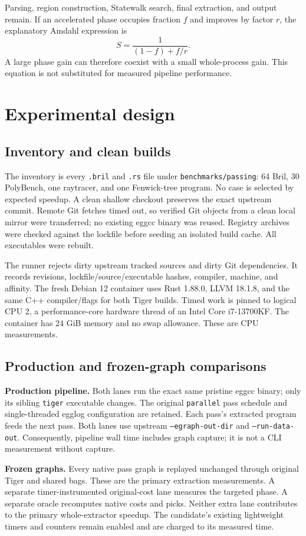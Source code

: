 \documentclass[10pt,a4paper]{article}
\newcommand{\tool}[1]{\texttt{#1}}
\begin{document}
Parsing, region construction, Statewalk search, final extraction, and output
remain. If an accelerated phase occupies fraction $f$ and improves by factor $r$,
the explanatory Amdahl expression is
\[
 S=\frac{1}{(1-f)+f/r}.
\]
A large phase gain can therefore coexist with a small whole-process gain.
This equation is not substituted for measured pipeline performance.

\section{Experimental design}
\subsection{Inventory and clean builds}
The inventory is every \tool{.bril} and \tool{.rs} file under
\tool{benchmarks/passing}: 64 Bril, 30 PolyBench, one raytracer, and one
Fenwick-tree program. No case is selected by expected speedup.
A clean shallow checkout preserves the exact upstream commit. Remote Git
fetches timed out, so verified Git objects from a clean local mirror were
transferred; no existing eggcc binary was reused. Registry archives were checked
against the lockfile before seeding an isolated build cache. All executables
were rebuilt.

The runner rejects dirty upstream tracked sources and dirty Git dependencies.
It records revisions, lockfile/source/executable hashes, compiler, machine, and
affinity. The fresh Debian 12 container uses Rust 1.88.0, LLVM 18.1.8, and the same
C++ compiler/flags for both Tiger builds. Timed work is pinned to logical CPU 2,
a performance-core hardware thread of an Intel Core i7-13700KF. The container has
24 GiB memory and no swap allowance. These are CPU measurements.

\subsection{Production and frozen-graph comparisons}
\textbf{Production pipeline.}
Both lanes run the exact same pristine eggcc binary; only its sibling
\tool{tiger} executable changes. The original \tool{parallel} pass schedule and
single-threaded egglog configuration are retained. Each pass's extracted program
feeds the next pass. Both lanes use upstream \tool{--egraph-out-dir} and
\tool{--run-data-out}. Consequently, pipeline wall time includes graph capture;
it is not a CLI measurement without capture.

\textbf{Frozen graphs.}
Every native pass graph is replayed unchanged through original Tiger and shared
bags. These are the primary extraction measurements. A separate
timer-instrumented original-cost lane measures the targeted phase. A separate
oracle recomputes native costs and picks. Neither extra lane contributes to
the primary whole-extractor speedup. The candidate's existing lightweight timers
and counters remain enabled and are charged to its measured time.
\end{document}
